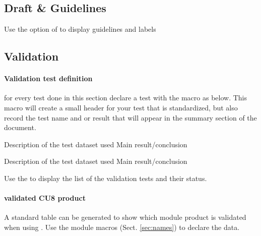 \subsection{Draft \& Guidelines}

Use the  option  of  to display guidelines and labels

\subsection{Validation}

\paragraph*{Validation test definition}

for every test done in this section declare a test with the \fverb{\valtest} macro as below.
This macro will create a small header for your test that is standardized, but also
record the test name and \fverb{\fail} or \fverb{\pass} result that will appear in the summary section of the document.

{Description of the test}
{dataset used}
{Main result/conclusion}
{\pass}  

{Description of the test}
{dataset used}
{Main result/conclusion}
{\fail}  

Use the \fverb{\listofvaltest} to display the list of the validation tests and their status.

\paragraph*{validated CU8 product}

A standard table can be generated to show which module product is validated when using . Use the module macros (Sect. \ref{sec:names}) to declare the data.

\useddatalist{\dsc}{\msc}